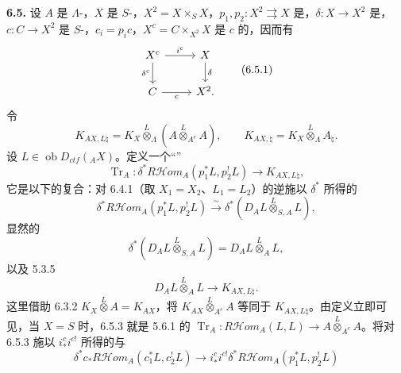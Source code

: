 \textbf{6.5.} 设 $A$ 是 $\Lambda$-，$X$ 是 $S$-，$X^2=X\times_SX$，$p_1,p_2:X^2\rightrightarrows X$ 是，$\delta:X\to X^2$ 是，$c:C\to X^2$ 是 $S$-，$c_i=p_ic$，$X^c=C\times_{X^2}X$ 是 $c$ 的，因而有
\begin{equation}\begin{tikzcd}X^c\arrow[r,"i^c"]\arrow[d,"\delta^c"']&X\arrow[d,"\delta"]\\ C\arrow[r,"c"']&X^2.\end{tikzcd}\tag{6.5.1}\end{equation}
令
\begin{equation}K_{AX,L\natural}=K_X\overset L\otimes_\Lambda(A\overset L\otimes_{A^e}A),\qquad K_{AX,\natural}=K_X\overset L\otimes_\Lambda A_\natural.\tag{6.5.2}\end{equation}
设 $L\in\operatorname{ob}D_{ctf}({}_AX)$。定义一个“”
\begin{equation}\operatorname{Tr}_A:\delta^*R\mathcal H\!om_A(p_1^*L,p_2^!L)\longrightarrow K_{AX,L\natural},\tag{6.5.3}\end{equation}
它是以下的复合：对 6.4.1（取 $X_1=X_2$、$L_1=L_2$）的逆施以 $\delta^*$ 所得的
\begin{equation}\delta^*R\mathcal H\!om_A(p_1^*L,p_2^!L)\xrightarrow\sim\delta^*(D_AL\overset L\otimes_{S,A}L),\tag{6.5.4}\end{equation}
显然的
\begin{equation}\delta^*(D_AL\overset L\otimes_{S,A}L)=D_AL\overset L\otimes_A L,\tag{6.5.5}\end{equation}
以及 5.3.5
\begin{equation}D_AL\overset L\otimes_A L\longrightarrow K_{AX,L\natural}.\tag{6.5.6}\end{equation}
这里借助 6.3.2 $K_X\overset L\otimes A=K_{AX}$，将 $K_{AX}\overset L\otimes_{A^e}A$ 等同于 $K_{AX,L\natural}$。由定义立即可见，当 $X=S$ 时，6.5.3 就是 5.6.1 的 $\operatorname{Tr}_A:R\mathcal H\!om_A(L,L)\to A\overset L\otimes_{A^e}A$。将对 6.5.3 施以 $i_*^c i^{c!}$ 所得的与
\begin{equation}\delta^*c_*R\mathcal H\!om_A(c_1^*L,c_2^!L)\longrightarrow i_*^ci^{c!}\delta^*R\mathcal H\!om_A(p_1^*L,p_2^!L)\tag{6.5.7}\end{equation}
